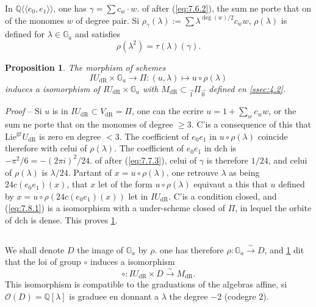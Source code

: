 \documentclass[11pt,a4paper]{article}
\theoremstyle{plain}
\newtheorem{proposition}[theorem]{Proposition}
\theoremstyle{definition}
\newcommand{\Q}{\mathbb{Q}}
\newcommand{\Ga}{\mathbb{G}_a}
\newcommand{\dR}{\mathrm{dR}}
\newcommand{\gr}{\mathrm{gr}}
\begin{document}
In $\Q\langle\langle e_0,e_1 \rangle\rangle$, one has $\gamma = \sum c_w \cdot w$. of after (\ref{eq:7.6.2}), the sum ne porte that on of the monomes $w$ of degree pair. Si $\rho_{\gamma}(\lambda) := \sum \lambda^{\deg(w)/2} c_w w$, $\rho(\lambda)$ is defined for $\lambda \in \Ga$ and satisfies
\begin{equation}\label{eq:7.7.3}
\rho(\lambda^2) = \tau(\lambda)(\gamma).
\end{equation}

\begin{proposition}\label{prop:7.8}
The morphism of schemes
\begin{equation}\label{eq:7.8.1}
IU_{\dR} \times \Ga \to \Pi: (u, \lambda) \mapsto u \circ \rho(\lambda)
\end{equation}
induces a isomorphism of $IU_{\dR} \times \Ga$ with $M_{\dR} \subset {}_{\vec{1}}\Pi_{\vec{0}}$ defined en \ref{ssec:4.2}.
\end{proposition}

\noindent \textit{Proof} -- Si $u$ is in $IU_{\dR} \subset V_{\dR} = \Pi$, one can the ecrire $u = 1 + \sum_w c_w w$, or the sum ne porte that on the monomes of degree $\geq 3$. C'is a consequence of this that $\mathrm{Lie}^{\gr} U_{\dR}$ is zero en degree $< 3$. The coefficient of $e_0 e_1$ in $u \circ \rho(\lambda)$ coincide therefore with celui of $\rho(\lambda)$. The coefficient of $e_0 e_1$ in $\mathrm{dch}$ is $-\pi^2/6 = -(2\pi i)^2/24$. of after (\ref{eq:7.7.3}), celui of $\gamma$ is therefore $1/24$, and celui of $\rho(\lambda)$ is $\lambda/24$. Partant of $x = u \circ \rho(\lambda)$, one retrouve $\lambda$ as being $24 c(e_0 e_1)(x)$, that $x$ let of the form $u \circ \rho(\lambda)$ equivaut a this that $u$ defined by $x = u \circ \rho(24 c(e_0 e_1)(x))$ let in $IU_{\dR}$. C'is a condition closed, and (\ref{eq:7.8.1}) is a isomorphism with a under-scheme closed of $\Pi$, in lequel the orbite of $\mathrm{dch}$ is dense. This proves \ref{prop:7.8}.

\subsection{}\label{ssec:7.9}

We shall denote $D$ the image of $\Ga$ by $\rho$. one has therefore $\rho: \Ga \xrightarrow{\sim} D$, and \ref{prop:7.8} dit that the loi of group $\circ$ induces a isomorphism
\begin{equation}\label{eq:7.9.1}
\circ: IU_{\dR} \times D \xrightarrow{\sim} M_{\dR}.
\end{equation}
This isomorphism is compatible to the graduations of the algebras affine, si $\mathcal{O}(D) = \Q[\lambda]$ is graduee en donnant a $\lambda$ the degree $-2$ (codegre $2$).
\end{document}
